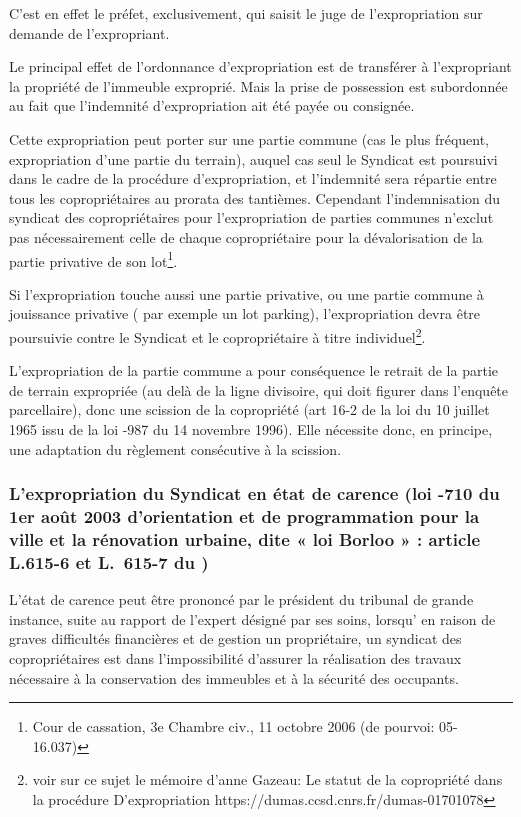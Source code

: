 		C'est en effet le préfet, exclusivement, qui saisit le juge de l'expropriation sur demande de l'expropriant.
	
		Le principal effet de l'ordonnance d'expropriation est de transférer à l'expropriant la propriété de
		l'immeuble exproprié. Mais la prise de possession est subordonnée au fait que l'indemnité d'expropriation
		ait été payée ou consignée.
		
		Cette expropriation peut porter sur une partie commune (cas le plus fréquent, expropriation d’une partie
		du terrain), auquel cas seul le Syndicat est poursuivi dans le cadre de la procédure d’expropriation, et
		l’indemnité sera répartie entre tous les copropriétaires au prorata des tantièmes. Cependant
		l'indemnisation du syndicat des copropriétaires pour l'expropriation de parties communes n'exclut pas
		nécessairement celle de chaque copropriétaire pour la dévalorisation de la partie privative de son lot\footnote{Cour de cassation, 3e Chambre civ., 11 octobre 2006 (\no de pourvoi: 05-16.037)}.
		
		Si l’expropriation touche aussi une partie privative, ou une partie commune à jouissance privative ( par
		exemple un lot parking), l’expropriation devra être poursuivie contre le Syndicat et le copropriétaire à titre
		individuel\footnote{voir sur ce sujet le mémoire d’anne Gazeau: Le statut de la copropriété dans la procédure
			D’expropriation https://dumas.ccsd.cnrs.fr/dumas-01701078}.
		
		L’expropriation de la partie commune a pour conséquence le retrait de la partie de terrain expropriée (au
		delà de la ligne divisoire, qui doit figurer dans l’enquête parcellaire), donc une scission de la copropriété
		(art 16-2 de la loi du 10 juillet 1965 issu de la loi -987 du 14 novembre 1996). Elle nécessite donc, en
		principe, une adaptation du règlement consécutive à la scission.
		
		\subsubsection{L’expropriation du Syndicat en état de carence (loi -710 du 1er août 2003 d'orientation et de programmation pour la ville et la rénovation urbaine, dite « loi Borloo » : article L.615-6 et L.~615-7 du \CCH)}
		
		L’état de carence peut être prononcé par le président du tribunal de grande instance, suite au rapport de
		l’expert désigné par ses soins, lorsqu' en raison de graves difficultés financières et de gestion un
		propriétaire, un syndicat des copropriétaires est dans l’impossibilité d’assurer la réalisation des travaux
		nécessaire à la conservation des immeubles et à la sécurité des occupants.
		
